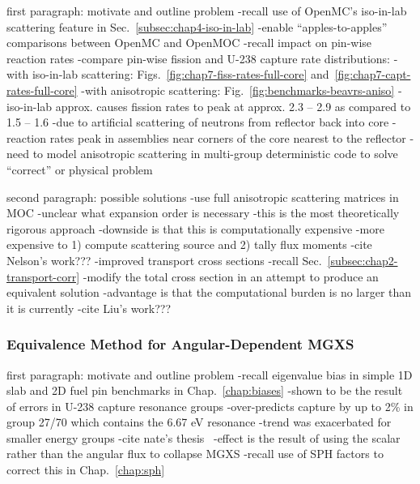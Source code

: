 first paragraph: motivate and outline problem
-recall use of OpenMC's iso-in-lab scattering feature in Sec.~\ref{subsec:chap4-iso-in-lab}
  -enable ``apples-to-apples'' comparisons between OpenMC and OpenMOC
-recall impact on pin-wise reaction rates
  -compare pin-wise fission and U-238 capture rate distributions:
    -with iso-in-lab scattering: Figs.~\ref{fig:chap7-fiss-rates-full-core} and~\ref{fig:chap7-capt-rates-full-core}
    -with anisotropic scattering: Fig.~\ref{fig:benchmarks-beavrs-aniso}
  -iso-in-lab approx. causes fission rates to peak at approx. 2.3 -- 2.9 as compared to 1.5 -- 1.6
    -due to artificial scattering of neutrons from reflector back into core
    -reaction rates peak in assemblies near corners of the core nearest to the reflector
-need to model anisotropic scattering in multi-group deterministic code to solve ``correct'' or physical problem

second paragraph: possible solutions
-use full anisotropic scattering matrices in MOC
  -unclear what expansion order is necessary
  -this is the most theoretically rigorous approach
  -downside is that this is computationally expensive
    -more expensive to 1) compute scattering source and 2) tally flux moments
  -cite Nelson's work???
-improved transport cross sections
  -recall Sec.~\ref{subsec:chap2-transport-corr}
  -modify the total cross section in an attempt to produce an equivalent solution 
  -advantage is that the computational burden is no larger than it is currently
  -cite Liu's work???

\subsubsection{Equivalence Method for Angular-Dependent MGXS}
\label{subsubsec:chap12-angular-dependent-mgxs}

first paragraph: motivate and outline problem
-recall eigenvalue bias in simple 1D slab and 2D fuel pin benchmarks in Chap.~\ref{chap:biases}
-shown to be the result of errors in U-238 capture resonance groups
  -over-predicts capture by up to 2\% in group 27/70 which contains the 6.67 eV resonance 
  -trend was exacerbated for smaller energy groups
-cite nate's thesis~\cite{gibson2016thesis}
  -effect is the result of using the scalar rather than the angular flux to collapse \ac{MGXS}
-recall use of \ac{SPH} factors to correct this in Chap.~\ref{chap:sph}

